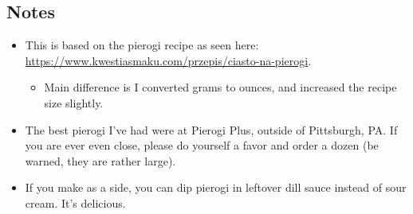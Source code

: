 \begin{multicols}{2}
\subsection*{Notes}
\begin{itemize}
    \item This is based on the pierogi recipe as seen here: \url{https://www.kwestiasmaku.com/przepis/ciasto-na-pierogi}.
    \begin{itemize}
        \item Main difference is I converted grams to ounces, and increased the recipe size slightly.
    \end{itemize}
    \item The best pierogi I've had were at Pierogi Plus, outside of Pittsburgh, PA. If you are ever even close, please do yourself a favor and order a dozen (be warned, they are rather large).
    \item If you make  as a side, you can dip pierogi in leftover dill sauce instead of sour cream. It's delicious.
\end{itemize}
\end{multicols}
\clearpage